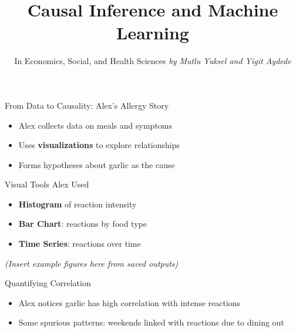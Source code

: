\documentclass[
  ignorenonframetext,
]{beamer}
\title{Causal Inference and Machine Learning}
\subtitle{In Economics, Social, and Health Sciences
\newline \smallskip \textit{by Mutlu Yuksel and Yigit Aydede}}
\author{}
\date{\vspace{-2.5em}}
\newenvironment{Shaded}{\begin{snugshade}}{\end{snugshade}}
\newcommand{\FunctionTok}[1]{\textcolor[rgb]{0.13,0.29,0.53}{\textbf{#1}}}
\newcommand{\NormalTok}[1]{#1}
\newcommand{\SpecialCharTok}[1]{\textcolor[rgb]{0.81,0.36,0.00}{\textbf{#1}}}
\providecommand{\tightlist}{%
  \setlength{\itemsep}{0pt}\setlength{\parskip}{0pt}}
\begin{document}
\frame{\titlepage}

\begin{frame}{From Data to Causality: Alex's Allergy Story}
\protect\hypertarget{from-data-to-causality-alexs-allergy-story}{}
\begin{itemize}
\tightlist
\item
  Alex collects data on meals and symptoms
\item
  Uses \textbf{visualizations} to explore relationships
\item
  Forms hypotheses about garlic as the cause
\end{itemize}

\end{frame}

\begin{frame}{Visual Tools Alex Used}
\protect\hypertarget{visual-tools-alex-used}{}
\begin{itemize}
\tightlist
\item
  \textbf{Histogram} of reaction intensity
\item
  \textbf{Bar Chart}: reactions by food type
\item
  \textbf{Time Series}: reactions over time
\end{itemize}

\emph{(Insert example figures here from saved outputs)}

\end{frame}

\begin{frame}[fragile]{Quantifying Correlation}
\protect\hypertarget{quantifying-correlation}{}
\begin{itemize}
\tightlist
\item
  Alex notices garlic has high correlation with intense reactions
\item
  Some spurious patterns: weekends linked with reactions due to dining
  out
\end{itemize}

\begin{Shaded}
\end{Shaded}

\end{frame}
\end{document}
